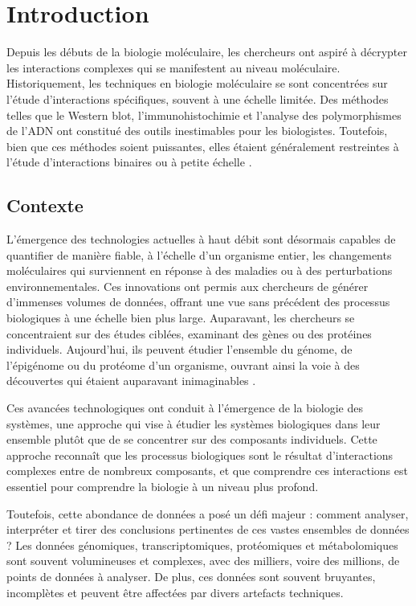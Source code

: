 \setcounter{secnumdepth}{1}

\chapter{Introduction}
Depuis les débuts de la biologie moléculaire, les chercheurs ont aspiré à décrypter les interactions complexes qui se manifestent au niveau moléculaire. Historiquement, les techniques en biologie moléculaire se sont concentrées sur l'étude d'interactions spécifiques, souvent à une échelle limitée. Des méthodes telles que le Western blot, l'immunohistochimie et l'analyse des polymorphismes de l'ADN ont constitué des outils inestimables pour les biologistes. Toutefois, bien que ces méthodes soient puissantes, elles étaient généralement restreintes à l'étude d'interactions binaires ou à petite échelle \cite{zhang2019}.

\section{Contexte}
L'émergence des technologies actuelles à haut débit sont désormais capables de quantifier de manière fiable, à l’échelle d’un organisme entier, les changements moléculaires qui surviennent en réponse à des maladies ou à des perturbations environnementales\cite{Pasquier2023}. Ces innovations ont permis aux chercheurs de générer d'immenses volumes de données, offrant une vue sans précédent des processus biologiques à une échelle bien plus large. Auparavant, les chercheurs se concentraient sur des études ciblées, examinant des gènes ou des protéines individuels. Aujourd'hui, ils peuvent étudier l'ensemble du génome, de l'épigénome ou du protéome d'un organisme, ouvrant ainsi la voie à des découvertes qui étaient auparavant inimaginables \cite{merelli2014}.

Ces avancées technologiques ont conduit à l'émergence de la biologie des systèmes, une approche qui vise à étudier les systèmes biologiques dans leur ensemble plutôt que de se concentrer sur des composants individuels. Cette approche reconnaît que les processus biologiques sont le résultat d'interactions complexes entre de nombreux composants, et que comprendre ces interactions est essentiel pour comprendre la biologie à un niveau plus profond.

Toutefois, cette abondance de données a posé un défi majeur : comment analyser, interpréter et tirer des conclusions pertinentes de ces vastes ensembles de données ? Les données génomiques, transcriptomiques, protéomiques et métabolomiques sont souvent volumineuses et complexes, avec des milliers, voire des millions, de points de données à analyser. De plus, ces données sont souvent bruyantes, incomplètes et peuvent être affectées par divers artefacts techniques.

